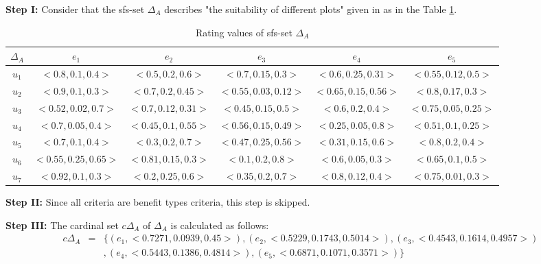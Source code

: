 \documentclass{IJFS}
\begin{document}
\textbf{Step I:} Consider that the sfs-set $\Delta_A$ describes
"the suitability of different plots" given in \cite{per} as in the
Table \ref{tab2}. \begin{table}[!h] 
\begin{center}\caption{Rating values of sfs-set $\Delta_A$ \label{tab2}}
\begin{tabular}{c|c c c c c}\hline
$\Delta_A$ & $e_1$ & $e_2$ & $e_3$ &$e_4$&$e_5$ \\
\hline $u_1$&$<0.8,0.1,0.4>$ &$<0.5,0.2,0.6> $&$<0.7, 0.15,
0.3>$&$<0.6, 0.25, 0.31>$&$<0.55, 0.12, 0.5>$
\\  $u_2$ &$<0.9, 0.1,0.3>$&$<0.7, 0.2,0.45>$&$<0.55,0.03, 0.12>$&$<0.65, 0.15, 0.56>$&$<0.8, 0.17, 0.3>$\\
 $u_3$&$<0.52, 0.02, 0.7>$&$<0.7, 0.12,0.31>$&$<0.45, 0.15, 0.5>$&$<0.6, 0.2, 0.4>$&$<0.75, 0.05,
 0.25>$\\ $u_4$&$<0.7, 0.05, 0.4>$&$<0.45, 0.1, 0.55>$&$<0.56, 0.15,
 0.49>$&$<0.25, 0.05, 0.8>$&$<0.51, 0.1, 0.25>$\\$u_5$&$<0.7, 0.1,
 0.4>$&$<0.3, 0.2, 0.7>$&$<0.47, 0.25, 0.56>$&$<0.31, 0.15,
 0.6>$&$<0.8, 0.2, 0.4>$\\$u_6$&$<0.55,0.25, 0.65>$&$<0.81, 0.15,
 0.3>$&$<0.1, 0.2, 0.8>$&$<0.6, 0.05, 0.3>$&$<0.65,
 0.1,0.5>$\\$u_7$&$<0.92,0.1, 0.3>$&$<0.2, 0.25, 0.6>$&$<0.35, 0.2,
 0.7>$&$<0.8, 0.12, 0.4>$&$<0.75, 0.01, 0.3>$
\end{tabular}\end{center}
\end{table}

 \textbf{Step II:} Since all criteria are benefit types criteria, this step is skipped.

\textbf{Step III:} The cardinal set $c\Delta_A$ of $\Delta_A$ is
calculated as follows:
\begin{eqnarray*} c\Delta_A&=&\{(e_1, <0.7271,0.0939, 0.45>), (e_2,<0.5229, 0.1743, 0.5014>),(e_3,<0.4543, 0.1614, 0.4957>)\\&& ,
(e_4,<0.5443, 0.1386, 0.4814>),(e_5,<0.6871, 0.1071, 0.3571>)\}
\end{eqnarray*}
\end{document}
